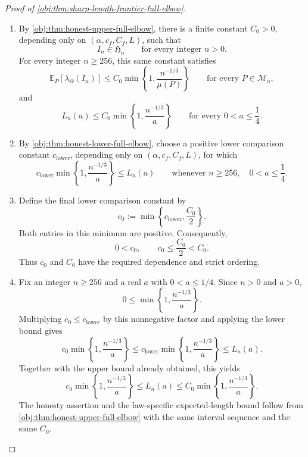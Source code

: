 \begin{proof}[Proof of \cref{obj:thm:sharp-length-frontier-full-elbow}]
\begin{enumerate}
\item By \cref{obj:thm:honest-upper-full-elbow}, there is a finite constant \(C_0>0\), depending only on \((\alpha,c_f,C_f,L)\), such that
\[
I_n\in\mathfrak H_n
\qquad\text{for every integer }n>0.
\]
For every integer \(n\ge256\), this same constant satisfies
\[
\mathbb E_P\!\left[\lambda_{\Theta}(I_n)\right]
\le C_0\min\left\{1,\frac{n^{-1/3}}{\mu(P)}\right\}
\qquad\text{for every }P\in\mathcal M_n,
\]
and
\[
L_n(a)\le C_0\min\left\{1,\frac{n^{-1/3}}{a}\right\}
\qquad\text{for every }0<a\le\frac14.
\]

\item By \cref{obj:thm:honest-lower-full-elbow}, choose a positive lower comparison constant \(c_{\mathrm{lower}}\), depending only on \((\alpha,c_f,C_f,L)\), for which
\[
c_{\mathrm{lower}}\min\left\{1,\frac{n^{-1/3}}{a}\right\}
\le L_n(a)
\qquad
\text{whenever }n\ge256,\quad 0<a\le\frac14.
\]

\item Define the final lower comparison constant by
\[
c_0:=\min\left\{c_{\mathrm{lower}},\frac{C_0}{2}\right\}.
\]
Both entries in this minimum are positive. Consequently,
\[
0<c_0,
\qquad
c_0\le\frac{C_0}{2}<C_0.
\]
Thus \(c_0\) and \(C_0\) have the required dependence and strict ordering.

\item Fix an integer \(n\ge256\) and a real \(a\) with \(0<a\le1/4\). Since \(n>0\) and \(a>0\),
\[
0\le\min\left\{1,\frac{n^{-1/3}}{a}\right\}.
\]
Multiplying \(c_0\le c_{\mathrm{lower}}\) by this nonnegative factor and applying the lower bound gives
\[
c_0\min\left\{1,\frac{n^{-1/3}}{a}\right\}
\le
c_{\mathrm{lower}}\min\left\{1,\frac{n^{-1/3}}{a}\right\}
\le L_n(a).
\]
Together with the upper bound already obtained, this yields
\[
c_0\min\left\{1,\frac{n^{-1/3}}{a}\right\}
\le L_n(a)
\le C_0\min\left\{1,\frac{n^{-1/3}}{a}\right\}.
\]
The honesty assertion and the law-specific expected-length bound follow from \cref{obj:thm:honest-upper-full-elbow} with the same interval sequence and the same \(C_0\).
\end{enumerate}
\end{proof}

